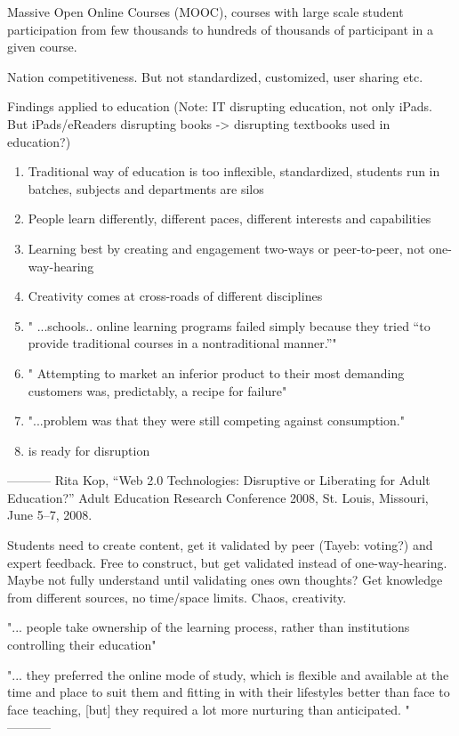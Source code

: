 \documentclass[a4paper,10pt]{book}
\begin{document}
Massive Open Online Courses (MOOC), courses with large scale student participation from few thousands to hundreds of thousands of participant 
in a given course.


Nation competitiveness. But not standardized, customized, user sharing etc.



Findings applied to education 
(Note: IT disrupting education, not only iPads. But iPads/eReaders disrupting books -> disrupting textbooks used in education?)
\begin{enumerate}
 \item Traditional way of education is too inflexible, standardized, students run in batches, subjects and departments are silos
 \item People learn differently, different paces, different interests and capabilities 
 \item Learning best by creating and engagement two-ways or peer-to-peer, not one-way-hearing \cite{disruptiveOrLiberatingEducation}
 \item Creativity comes at cross-roads of different disciplines 
 \item " ...schools.. online learning programs failed simply because they tried “to provide traditional courses in a nontraditional manner.”"
 \item " Attempting to market an inferior product to their most demanding customers was, predictably, a recipe for failure"
 \item "...problem was that they were still competing against consumption."
 \item is ready for disruption
\end{enumerate}


-----------
Rita Kop, “Web 2.0 Technologies: Disruptive or Liberating for Adult Education?” Adult Education Research Conference 2008, St. Louis, Missouri, June 5–7, 2008.
  
Students need to create content, get it validated by peer (Tayeb: voting?) and expert feedback.
Free to construct, but get validated instead of one-way-hearing. Maybe not fully understand until validating ones own thoughts?
Get knowledge from different sources, no time/space limits. Chaos, creativity.

"... people take ownership of the learning process, rather than institutions controlling their education"

"... they preferred the online
mode of study, which is flexible and available at the time and place to suit them and fitting in
with their lifestyles better than face to face teaching, [but] they required a lot more nurturing than
anticipated. "
-----------
\end{document}
